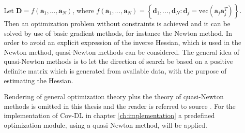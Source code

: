 Let $\textbf{D} = f(\textbf{a}_1, \hdots, \textbf{a}_N)$, where $f(\textbf{a}_1, \hdots, \textbf{a}_N) = \left\{\textbf{d}_1, \hdots, \textbf{d}_N : \textbf{d}_j = \text{vec}(\textbf{a}_j\textbf{a}_j^T) \right\} $. Then an optimization problem without constraints is achieved and it can be solved by use of basic gradient methods, for instance the Newton method. In order to avoid an explicit expression of the inverse Hessian, which is used in the Newton method, quasi-Newton methods can be considered\cite{Optimization2007}.  
The general idea of quasi-Newton methods is to let the direction of search be based on a positive definite matrix which is generated from available data, with the purpose of estimating the Hessian. 

Rendering of general optimization theory plus the theory of quasi-Newton methods is omitted in this thesis and the reader is referred to source \cite{Optimization2007}.
For the implementation of Cov-DL in chapter \ref{ch:implementation} a predefined optimization module, using a quasi-Newton method, will be applied.   
   

